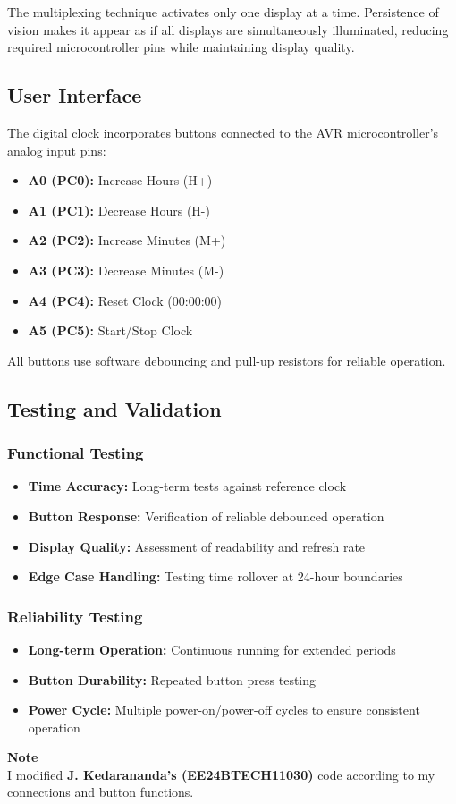 \documentclass[12pt]{article}
\begin{document}
The multiplexing technique activates only one display at a time. Persistence of vision makes it appear as if all displays are simultaneously illuminated, reducing required microcontroller pins while maintaining display quality.

\subsection{User Interface}
The digital clock incorporates buttons connected to the AVR microcontroller's analog input pins:

\begin{itemize}
    \item \textbf{A0 (PC0):} Increase Hours (H+)
    \item \textbf{A1 (PC1):} Decrease Hours (H-)
    \item \textbf{A2 (PC2):} Increase Minutes (M+)
    \item \textbf{A3 (PC3):} Decrease Minutes (M-)
    \item \textbf{A4 (PC4):} Reset Clock (00:00:00)
    \item \textbf{A5 (PC5):} Start/Stop Clock
\end{itemize}

All buttons use software debouncing and pull-up resistors for reliable operation.

\subsection{Testing and Validation}
\subsubsection{Functional Testing}
\begin{itemize}
    \item \textbf{Time Accuracy:} Long-term tests against reference clock
    \item \textbf{Button Response:} Verification of reliable debounced operation
    \item \textbf{Display Quality:} Assessment of readability and refresh rate
    \item \textbf{Edge Case Handling:} Testing time rollover at 24-hour boundaries
\end{itemize}

\subsubsection{Reliability Testing}
\begin{itemize}
    \item \textbf{Long-term Operation:} Continuous running for extended periods
    \item \textbf{Button Durability:} Repeated button press testing
    \item \textbf{Power Cycle:} Multiple power-on/power-off cycles to ensure consistent operation
\end{itemize}

\textbf{Note}\\
I modified \textbf{J. Kedarananda's (EE24BTECH11030)} code according to my connections and button functions.
\end{document}
